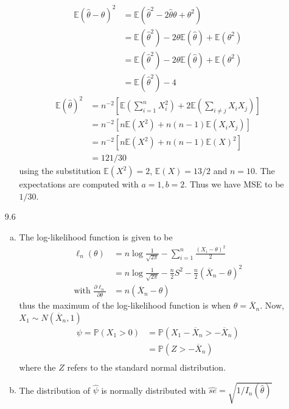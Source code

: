 \documentclass[a4paper,10pt]{article}
\theoremstyle{definition}
\begin{document}
\begin{enumerate}
\begin{enumerate}[(a)]
\begin{align*}
\mathbb{E}(\hat{\theta}-\theta)^2&=\mathbb{E}(\hat{\theta}^2-2\hat{\theta}\theta+\theta^2)\\
&=\mathbb{E}(\hat{\theta}^2)-2\theta\mathbb{E}(\hat{\theta})+\mathbb{E}(\theta^2)\\
&=\mathbb{E}(\hat{\theta}^2)-2\theta\mathbb{E}(\hat{\theta})+\mathbb{E}(\theta^2)\\
&=\mathbb{E}(\hat{\theta}^2)-4
\end{align*}
\begin{align*}
\mathbb{E}(\hat{\theta})^2&=n^{-2}\left[\mathbb{E}\left(\sum_{i=1}^{n}X_i^2\right)+2\mathbb{E}\left(\sum_{i\neq j}X_iX_j\right)\right]\\
&=n^{-2}\left[n\mathbb{E}\left(X^2\right)+n(n-1)\mathbb{E}\left(X_iX_j\right)\right]\\
&=n^{-2}\left[n\mathbb{E}\left(X^2\right)+n(n-1)\mathbb{E}\left(X\right)^2\right]\\
&=121/30
\end{align*}
using the substitution $\mathbb{E}(X^2) = 2 $, $\mathbb{E}(X) = 13/2$ and $n=10$. The expectations are computed with $a=1, b=2$. Thus we have {\sffamily MSE} to be $1/30$.
\end{enumerate}
\item[9.6] 
\begin{enumerate}[(a)]
\item The log-likelihood function is given to be
\begin{align*}
\ell_n(\theta)&=n\log\frac{1}{\sqrt{2\pi}}-\sum_{i=1}^{n}\frac{(X_i-\theta)^2}{2}\\
&=n\log\frac{1}{\sqrt{2\pi}}-\frac{n}{2}S^2-\frac{n}{2}(\overline{X}_n-\theta)^2\\
\text{with } \frac{\partial \ell_n}{\partial \theta}&=n(\overline{X}_n-\theta)
\end{align*}
thus the maximum of the log-likelihood function is when $\theta = \overline{X}_n$. Now, $X_1 \sim N(\overline{X}_n,1)$
\begin{align*}
\psi = \mathbb{P}(X_1 >0) &= \mathbb{P}\left(X_1 -\overline{X}_n > -\overline{X}_n\right)\\
&= \mathbb{P}\left( Z> -\overline{X}_n\right)\\
\end{align*}
where the $Z$ refers to the standard normal distribution.
\item The distribution of $\hat{\psi}$ is normally distributed with $\hat{se} = \sqrt{1/I_n(\hat{\theta})}$

\end{enumerate}
\end{enumerate}
\end{document}
